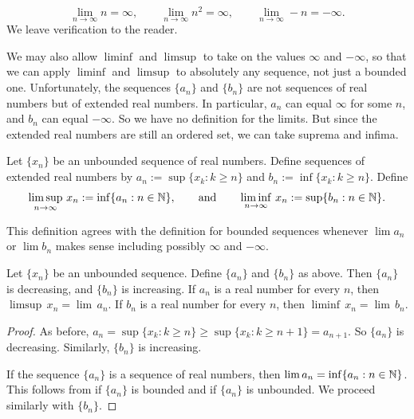 \begin{example}
\begin{equation*}
\lim_{n\to \infty} n = \infty,
\qquad 
\lim_{n\to \infty} n^2 = \infty,
\qquad 
\lim_{n\to \infty} -n = -\infty.
\end{equation*}
We leave verification to the reader.
\end{example}

We may also allow $\liminf$ and $\limsup$ to take on
the values $\infty$ and $-\infty$, so that
we can apply $\liminf$ and $\limsup$
to absolutely any sequence, not just
a bounded one.   Unfortunately, the sequences $\{ a_n \}$ and $\{ b_n \}$
are not sequences of real numbers but of extended real numbers.  In
particular, $a_n$ can equal $\infty$ for some $n$, and $b_n$ can equal
$-\infty$.  So we have no definition for the limits.
But since the extended real numbers are still an ordered set, we
can take suprema and infima.

\begin{defn}
Let $\{ x_n \}$ be an unbounded sequence of real numbers.  Define 
sequences of extended real numbers by
$a_n := \sup \{ x_k : k \geq n \}$ and
$b_n := \inf \{ x_k : k \geq n \}$.
Define
\begin{equation*}
\limsup_{n \to \infty} \, x_n := \inf \{ a_n : n \in {\mathbb{N}} \}, \qquad \text{and} \qquad
\liminf_{n \to \infty} \, x_n := \sup \{ b_n : n \in {\mathbb{N}} \}.
\end{equation*}
\end{defn}

This definition agrees with the definition for bounded
sequences whenever $\lim a_n$ or $\lim b_n$ makes sense including
possibly $\infty$ and $-\infty$.

\begin{prop}
Let $\{ x_n \}$ be an unbounded sequence.  Define 
$\{ a_n \}$ and $\{ b_n \}$ as above.
Then $\{ a_n \}$ is decreasing, and $\{ b_n \}$ is increasing.
If $a_n$ is a real number for every $n$, then
$\limsup \, x_n = \lim \, a_n$. 
If $b_n$ is a real number for every $n$, then
$\liminf \, x_n = \lim \, b_n$.
\end{prop}

\begin{proof}
As before,
$a_n = \sup \{ x_k : k \geq n \} \geq \sup \{ x_k : k \geq n+1 \} =
a_{n+1}$.  So $\{ a_n \}$ is decreasing. Similarly, $\{ b_n \}$ is increasing.

If the sequence $\{ a_n \}$ is a sequence of real numbers, then
$\lim a_n = \inf \{ a_n : n \in {\mathbb{N}} \}$.  This follows from
 if $\{ a_n \}$ is bounded and  if $\{a_n \}$
is unbounded.  We proceed similarly with $\{ b_n \}$.
\end{proof}

